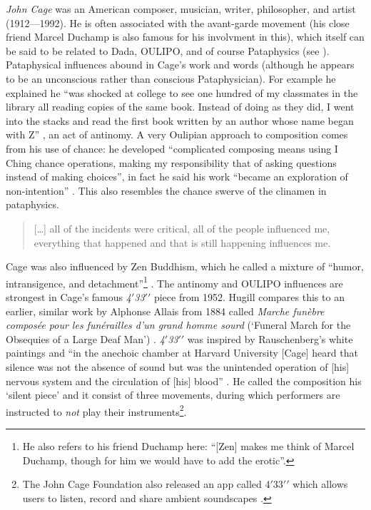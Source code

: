 \emph{John Cage} was an American composer, musician, writer, philosopher, and artist (1912---1992). He is often associated with the avant-garde movement (his close friend Marcel Duchamp is also famous for his involvment in this), which itself can be said to be related to Dada, \ac{OULIPO}, and of course Pataphysics (see \autocite{Hugill2012}). Pataphysical influences abound in Cage's work and words (although he appears to be an unconscious rather than conscious Pataphysician). For example he explained he ``was shocked at college to see one hundred of my classmates in the library all reading copies of the same book. Instead of doing as they did, I went into the stacks and read the first book written by an author whose name began with Z'' \autocite{Cage1989}, an act of antinomy. A very Oulipian approach to composition comes from his use of chance: he developed ``complicated composing means using I Ching chance operations, making my responsibility that of asking questions instead of making choices'', in fact he said his work ``became an exploration of non‑intention'' \autocite*{Cage1989}. This also resembles the chance swerve of the clinamen in pataphysics.

\begin{quotation}
  [\ldots] all of the incidents were critical, all of the people influenced me, everything that happened and that is still happening influences me. 
\end{quotation}

Cage was also influenced by Zen Buddhism, which he called a mixture of ``humor, intransigence, and detachment''\footnote{He also refers to his friend Duchamp here: ``[Zen] makes me think of Marcel Duchamp, though for him we would have to add the erotic''.} \autocite*{Cage1989}. The antinomy and \ac{OULIPO} influences are strongest in Cage's famous \textit{4$\prime$33$\prime\prime$} piece from 1952. Hugill compares this to an earlier, similar work by Alphonse Allais from 1884 called \textit{Marche funèbre composée pour les funérailles d’un grand homme sourd} (`Funeral March for the Obsequies of a Large Deaf Man') \autocite*{Hugill2012}. \textit{4$\prime$33$\prime\prime$} was inspired by Rauschenberg's white paintings \autocite*{Rauschenberg1951} and ``in the anechoic chamber at Harvard University [Cage] heard that silence was not the absence of sound but was the unintended operation of [his] nervous system and the circulation of [his] blood'' \autocite{Cage1989}. He called the composition his `silent piece' and it consist of three movements, during which performers are instructed to \emph{not} play their instruments\footnote{The John Cage Foundation also released an app called 4$\prime$33$\prime\prime$ which allows users to listen, record and share ambient soundscapes \autocite{Cage2016}.}.

